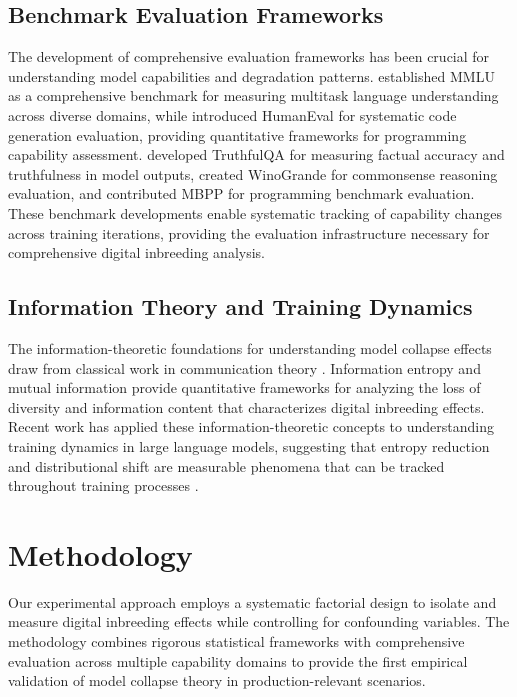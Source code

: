 \documentclass{article}
\begin{document}
\subsection{Benchmark Evaluation Frameworks}

The development of comprehensive evaluation frameworks has been crucial for understanding model capabilities and degradation patterns. \citet{hendrycks2020measuring} established MMLU as a comprehensive benchmark for measuring multitask language understanding across diverse domains, while \citet{chen2021evaluating} introduced HumanEval for systematic code generation evaluation, providing quantitative frameworks for programming capability assessment. \citet{lin2022truthfulqa} developed TruthfulQA for measuring factual accuracy and truthfulness in model outputs, \citet{sakaguchi2020winogrande} created WinoGrande for commonsense reasoning evaluation, and \citet{austin2021program} contributed MBPP for programming benchmark evaluation. These benchmark developments enable systematic tracking of capability changes across training iterations, providing the evaluation infrastructure necessary for comprehensive digital inbreeding analysis.

\subsection{Information Theory and Training Dynamics}

The information-theoretic foundations for understanding model collapse effects draw from classical work in communication theory \citep{shannon1948mathematical, cover1999elements}. Information entropy and mutual information provide quantitative frameworks for analyzing the loss of diversity and information content that characterizes digital inbreeding effects. Recent work has applied these information-theoretic concepts to understanding training dynamics in large language models, suggesting that entropy reduction and distributional shift are measurable phenomena that can be tracked throughout training processes \citep{hoffmann2022training}.

\section{Methodology}

Our experimental approach employs a systematic factorial design to isolate and measure digital inbreeding effects while controlling for confounding variables. The methodology combines rigorous statistical frameworks with comprehensive evaluation across multiple capability domains to provide the first empirical validation of model collapse theory in production-relevant scenarios.
\end{document}
